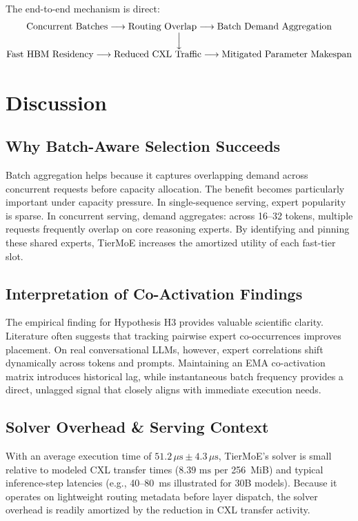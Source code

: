 \documentclass[10pt,journal,compsoc]{IEEEtran}
\begin{document}
The end-to-end mechanism is direct:
\begin{equation*}
    \begin{matrix}
    \text{Concurrent Batches} \longrightarrow \text{Routing Overlap} \longrightarrow \text{Batch Demand Aggregation} \\
    \Big\downarrow \\
    \text{Fast HBM Residency} \longrightarrow \text{Reduced CXL Traffic} \longrightarrow \text{Mitigated Parameter Makespan}
    \end{matrix}
\end{equation*}

\section{Discussion}
\label{sec:discussion}

\subsection{Why Batch-Aware Selection Succeeds}
Batch aggregation helps because it captures overlapping demand across concurrent requests before capacity allocation. The benefit becomes particularly important under capacity pressure. In single-sequence serving, expert popularity is sparse. In concurrent serving, demand aggregates: across 16--32 tokens, multiple requests frequently overlap on core reasoning experts. By identifying and pinning these shared experts, TierMoE increases the amortized utility of each fast-tier slot.

\subsection{Interpretation of Co-Activation Findings}
The empirical finding for Hypothesis H3 provides valuable scientific clarity. Literature often suggests that tracking pairwise expert co-occurrences improves placement. On real conversational LLMs, however, expert correlations shift dynamically across tokens and prompts. Maintaining an EMA co-activation matrix introduces historical lag, while instantaneous batch frequency provides a direct, unlagged signal that closely aligns with immediate execution needs.

\subsection{Solver Overhead \& Serving Context}
With an average execution time of $51.2\,\mu\text{s} \pm 4.3\,\mu\text{s}$, TierMoE's solver is small relative to modeled CXL transfer times ($8.39\text{ ms}$ per 256~MiB) and typical inference-step latencies (e.g., 40--80~ms illustrated for 30B models). Because it operates on lightweight routing metadata before layer dispatch, the solver overhead is readily amortized by the reduction in CXL transfer activity.
\end{document}

